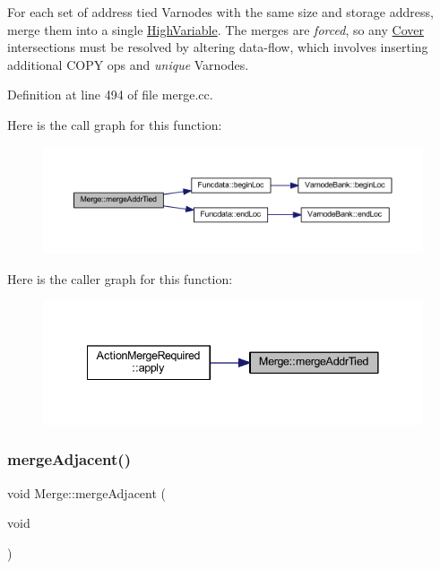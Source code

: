 For each set of address tied Varnodes with the same size and storage address, merge them into a single \mbox{\hyperlink{class_high_variable}{High\+Variable}}. The merges are {\itshape forced}, so any \mbox{\hyperlink{class_cover}{Cover}} intersections must be resolved by altering data-\/flow, which involves inserting additional C\+O\+PY ops and {\itshape unique} Varnodes. 

Definition at line 494 of file merge.\+cc.

Here is the call graph for this function\+:
\nopagebreak
\begin{figure}[H]
\begin{center}
\leavevmode
\includegraphics[width=350pt]{class_merge_a8045c24ce73080b02d4506f2047a414e_cgraph}
\end{center}
\end{figure}
Here is the caller graph for this function\+:
\nopagebreak
\begin{figure}[H]
\begin{center}
\leavevmode
\includegraphics[width=341pt]{class_merge_a8045c24ce73080b02d4506f2047a414e_icgraph}
\end{center}
\end{figure}
\mbox{\label{class_merge_a79f377000da91c9e50b89307fa88d268}} 
\subsubsection{\texorpdfstring{mergeAdjacent()}{mergeAdjacent()}}
{\footnotesize\ttfamily void Merge\+::merge\+Adjacent (\begin{DoxyParamCaption}\item[{void}]{ }\end{DoxyParamCaption})}



